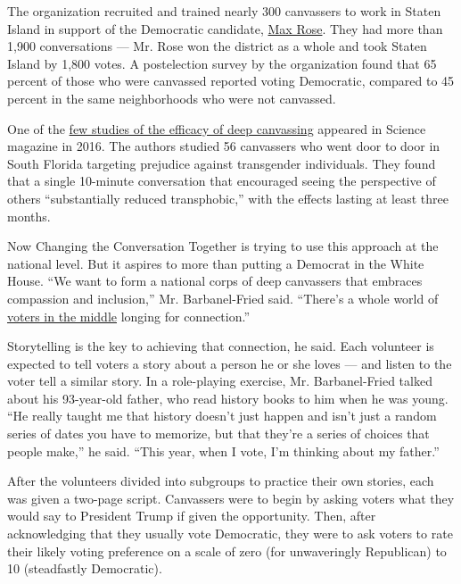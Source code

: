 The organization recruited and trained nearly 300 canvassers to work in
Staten Island in support of the Democratic candidate,
\href{https://www.nytimes3xbfgragh.onion/2018/11/07/nyregion/what-max-rose-can-teach-democrats-about-beating-republicans.html}{Max
Rose}. They had more than 1,900 conversations --- Mr. Rose won the
district as a whole and took Staten Island by 1,800 votes. A
postelection survey by the organization found that 65 percent of those
who were canvassed reported voting Democratic, compared to 45 percent in
the same neighborhoods who were not canvassed.

One of the
\href{https://science.sciencemag.org/content/352/6282/220.full}{few
studies of the efficacy of deep canvassing} appeared in Science magazine
in 2016. The authors studied 56 canvassers who went door to door in
South Florida targeting prejudice against transgender individuals. They
found that a single 10-minute conversation that encouraged seeing the
perspective of others ``substantially reduced transphobic,'' with the
effects lasting at least three months.

Now Changing the Conversation Together is trying to use this approach at
the national level. But it aspires to more than putting a Democrat in
the White House. ``We want to form a national corps of deep canvassers
that embraces compassion and inclusion,'' Mr. Barbanel-Fried said.
``There's a whole world of
\href{https://www.nytimes3xbfgragh.onion/2020/06/29/us/politics/trump-swing-voters.html}{voters
in the middle} longing for connection.''

Storytelling is the key to achieving that connection, he said. Each
volunteer is expected to tell voters a story about a person he or she
loves --- and listen to the voter tell a similar story. In a
role-playing exercise, Mr. Barbanel-Fried talked about his 93-year-old
father, who read history books to him when he was young. ``He really
taught me that history doesn't just happen and isn't just a random
series of dates you have to memorize, but that they're a series of
choices that people make,'' he said. ``This year, when I vote, I'm
thinking about my father.''

After the volunteers divided into subgroups to practice their own
stories, each was given a two-page script. Canvassers were to begin by
asking voters what they would say to President Trump if given the
opportunity. Then, after acknowledging that they usually vote
Democratic, they were to ask voters to rate their likely voting
preference on a scale of zero (for unwaveringly Republican) to 10
(steadfastly Democratic).

